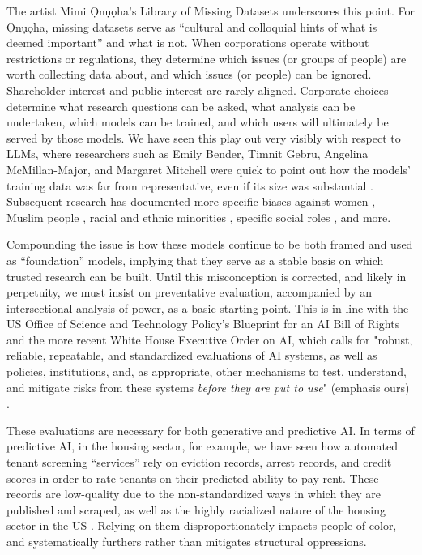 The artist Mimi \d{O}n\d{u}\d{o}ha's Library of Missing Datasets \cite{mimimimimi_2024} underscores this point. For \d{O}n\d{u}\d{o}ha, missing datasets serve as “cultural and colloquial hints of what is deemed important” and what is not. When corporations operate without restrictions or regulations, they determine which issues (or groups of people) are worth collecting data about, and which issues (or people) can be ignored. Shareholder interest and public interest are rarely aligned. Corporate choices determine what research questions can be asked, what analysis can be undertaken, which models can be trained, and which users will ultimately be served by those models. We have seen this play out very visibly with respect to LLMs, where researchers such as Emily Bender, Timnit Gebru, Angelina McMillan-Major, and Margaret Mitchell were quick to point out how the models' training data was far from representative, even if its size was substantial \cite{Bender_Gebru_McMillan-Major_Shmitchell_2021}. Subsequent research has documented more specific biases against women \cite{Kotek_Dockum_Sun_2023}, Muslim people \cite{Abid_Farooqi_Zou_2021}, racial and ethnic minorities \cite{Omiye_Lester_Spichak_Rotemberg_Daneshjou_2023, Salinas_Shah_Huang_McCormack_Morstatter_2023}, specific social roles \cite{Lucy_Gururangan_Soldaini_Strubell_Bamman_Klein_Dodge_2024}, and more. 


Compounding the issue is how these models continue to be both framed and used as “foundation” models, implying that they serve as a stable basis on which trusted research can be built. Until this misconception is corrected, and likely in perpetuity, we must insist on preventative evaluation, accompanied by an intersectional analysis of power, as a basic starting point. This is in line with the US Office of Science and Technology Policy’s Blueprint for an AI Bill of Rights \cite{Blueprint} and the more recent White House Executive Order on AI, which calls for "robust, reliable, repeatable, and standardized evaluations of AI systems, as well as policies, institutions, and, as appropriate, other mechanisms to test, understand, and mitigate risks from these systems \textit{before they are put to use}" (emphasis ours) \cite{House_2023}. 

These evaluations are necessary for both generative and predictive AI. In terms of predictive AI, in the housing sector, for example, we have seen how automated tenant screening “services” rely on eviction records, arrest records, and credit scores in order to rate tenants on their predicted ability to pay rent. These records are low-quality due to the non-standardized ways in which they are published and scraped, as well as the highly racialized nature of the housing sector in the US \cite{So_2023, Desmond_2016, Nellis_2021, Missing_Credit_2019}. Relying on them disproportionately impacts people of color, and systematically furthers rather than mitigates structural oppressions. 

